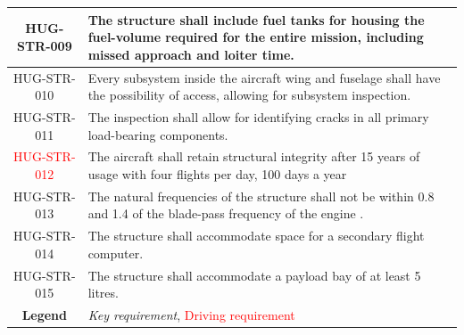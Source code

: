 \begin{longtable}{|c|p{13cm}|}
HUG-STR-009& The structure shall include fuel tanks for housing the fuel-volume required for the entire mission, including missed approach and loiter time. \\ \hline

HUG-STR-010 & Every subsystem inside the aircraft wing and fuselage shall have the possibility of access, allowing for subsystem inspection. \\ \hline  

HUG-STR-011 & The inspection shall allow for identifying cracks in all primary load-bearing components. \\ \hline  

\textcolor{red}{HUG-STR-012}&  The aircraft shall retain structural integrity after 15 years of usage with four flights per day, 100 days a year \\ \hline

HUG-STR-013& The natural frequencies of the structure shall not be within 0.8 and 1.4 \cite{Prakash2016DynamicFoundation} of the blade-pass frequency of the engine \cite{Alhazmi2025CoolingFanVibration}. \\ \hline


HUG-STR-014 & The structure shall accommodate space for a secondary flight computer. \\ \hline

HUG-STR-015 & The structure shall accommodate a payload bay of at least 5 litres. \\ \hline

\textbf{Legend} & \textit{Key requirement}, \textcolor{red}{Driving requirement} \\
\hline

\end{longtable}






